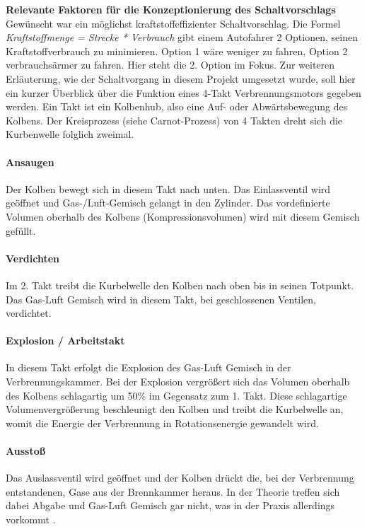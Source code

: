 \textbf{Relevante Faktoren für die Konzeptionierung des Schaltvorschlags\newline}
Gewünscht war ein möglichst kraftstoffeffizienter Schaltvorschlag.
Die Formel \textit{Kraftstoffmenge = Strecke * Verbrauch} gibt einem Autofahrer 2 Optionen, seinen Kraftstoffverbrauch zu minimieren. Option 1 wäre weniger zu fahren, Option 2 verbrauchsärmer zu fahren. Hier steht die 2. Option im Fokus. 
Zur weiteren Erläuterung, wie der Schaltvorgang in diesem Projekt umgesetzt wurde, soll hier ein kurzer Überblick über die Funktion eines 4-Takt Verbrennungsmotors gegeben werden. Ein Takt ist ein Kolbenhub, also eine Auf- oder Abwärtsbewegung des Kolbens. Der Kreisprozess (siehe Carnot-Prozess) von 4 Takten dreht sich die Kurbenwelle folglich zweimal.

\paragraph{Ansaugen}
Der Kolben bewegt sich in diesem Takt nach unten. Das Einlassventil wird geöffnet und Gas-/Luft-Gemisch gelangt in den Zylinder. Das vordefinierte Volumen oberhalb des Kolbens (Kompressionsvolumen) wird mit diesem Gemisch gefüllt.
\paragraph{Verdichten} 
Im 2. Takt treibt die Kurbelwelle den Kolben nach oben bis in seinen Totpunkt. Das Gas-Luft Gemisch wird in diesem Takt, bei geschlossenen Ventilen, verdichtet.
\paragraph{Explosion / Arbeitstakt}
In diesem Takt erfolgt die Explosion des Gas-Luft Gemisch in der Verbrennungskammer. Bei der Explosion vergrößert sich das Volumen oberhalb des Kolbens schlagartig um 50\% im Gegensatz zum 1. Takt. Diese schlagartige Volumenvergrößerung beschleunigt den Kolben und treibt die Kurbelwelle an, womit die Energie der Verbrennung in Rotationsenergie gewandelt wird. 
\paragraph{Ausstoß}
Das Auslassventil wird geöffnet und der Kolben drückt die, bei der Verbrennung entstandenen, Gase aus der Brennkammer heraus. In der Theorie treffen sich dabei Abgabe und Gas-Luft Gemisch gar nicht, was in der Praxis allerdings vorkommt \cite{SIMR.CH2-motorwirkungsgrad.4strokeEngine}.


